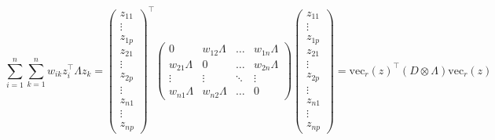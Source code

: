 \documentclass[openany]{book}
\begin{document}
$$
 \sum_{i=1}^n \sum_{k=1}^n w_{ik} z^{\top}_i \Lambda z_k = 
\begin{pmatrix}
z_{11} \\ \vdots \\ z_{1p} \\ z_{21} \\ \vdots \\ z_{2p} \\ \vdots \\z_{n1} \\ \vdots \\ z_{np}
\end{pmatrix}^{\top}
\begin{pmatrix}
0 & w_{12} \Lambda & \ldots & w_{1n} \Lambda\\
w_{21} \Lambda & 0 & \ldots & w_{2n} \Lambda\\
\vdots & \vdots & \ddots & \vdots \\
w_{n1} \Lambda & w_{n2} \Lambda & \ldots & 0
\end{pmatrix}
\begin{pmatrix}
z_{11} \\ \vdots \\ z_{1p} \\ z_{21} \\ \vdots \\ z_{2p} \\ \vdots \\z_{n1} \\ \vdots \\ z_{np}
\end{pmatrix}  = 
\mathrm{vec}_r(z) ^{\top} (D \otimes \Lambda) \mathrm{vec}_r(z)
$$
\end{document}
